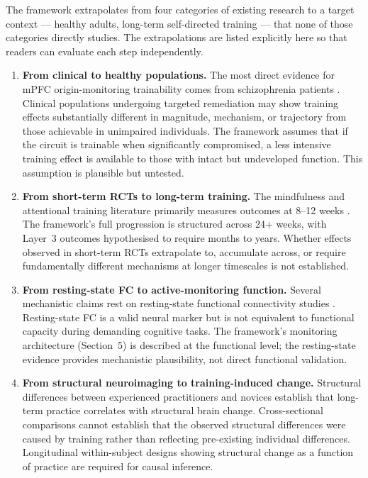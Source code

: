 \documentclass[12pt, a4paper]{article}
\begin{document}
The framework extrapolates from four categories of existing research to a target
context --- healthy adults, long-term self-directed training --- that none of
those categories directly studies. The extrapolations are listed explicitly here
so that readers can evaluate each step independently.

\begin{enumerate}[leftmargin=2em]

\item \textbf{From clinical to healthy populations.} The most direct evidence
for mPFC origin-monitoring trainability comes from schizophrenia patients
\citep{subramaniam2012}. Clinical populations undergoing targeted remediation
may show training effects substantially different in magnitude, mechanism, or
trajectory from those achievable in unimpaired individuals. The framework
assumes that if the circuit is trainable when significantly compromised, a less
intensive training effect is available to those with intact but undeveloped
function. This assumption is plausible but untested.

\item \textbf{From short-term RCTs to long-term training.} The mindfulness and
attentional training literature primarily measures outcomes at 8--12 weeks
\citep{jha2015, jha2016, jha2017, jha2020, ganesan2025}. The framework's
full progression is structured across 24+ weeks, with Layer~3 outcomes
hypothesised to require months to years. Whether effects observed in short-term
RCTs extrapolate to, accumulate across, or require fundamentally different
mechanisms at longer timescales is not established.

\item \textbf{From resting-state FC to active-monitoring function.} Several
mechanistic claims rest on resting-state functional connectivity studies
\citep{yue2023, grani2025}. Resting-state FC is a valid neural marker but
is not equivalent to functional capacity during demanding cognitive tasks.
The framework's monitoring architecture (Section~5) is described at the
functional level; the resting-state evidence provides mechanistic plausibility,
not direct functional validation.

\item \textbf{From structural neuroimaging to training-induced change.}
Structural differences between experienced practitioners and novices
\citep{calderone2024} establish that long-term practice correlates with
structural brain change. Cross-sectional comparisons cannot establish that the
observed structural differences were caused by training rather than reflecting
pre-existing individual differences. Longitudinal within-subject designs showing
structural change as a function of practice are required for causal inference.

\end{enumerate}
\end{document}
